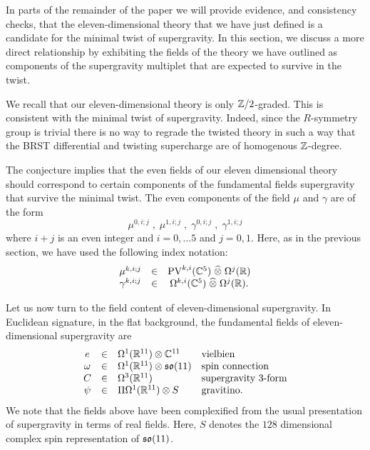 \documentclass[11pt]{amsart}
\def\pv{{\rm PV}}
\begin{document}

In parts of the remainder of the paper we will provide evidence, and consistency checks, that the eleven-dimensional theory that we have just defined is a candidate for the minimal twist of supergravity.
In this section, we discuss a more direct relationship by exhibiting the fields of the theory we have outlined as components of the supergravity multiplet that are expected to survive in the twist.

We recall that our eleven-dimensional theory is only $\mathbb Z/2$-graded.
This is consistent with the minimal twist of supergravity.
Indeed, since the $R$-symmetry group is trivial there is no way to regrade the twisted theory in such a way that the BRST differential and twisting supercharge are of homogenous $\mathbb Z$-degree.

The conjecture implies that the even fields of our eleven dimensional theory should correspond to certain components of the fundamental fields supergravity that survive the minimal twist.
The even components of the field $\mu$ and $\gamma$ are of the form
\[
  \mu^{0, i ; j} \; , \; \mu^{1, i ; j} \; , \; \gamma^{0, i ; j} \; , \; \gamma^{1, i ; j}
\]
where $i+j$ is an even integer and $i = 0,\ldots 5$ and $j=0,1$.
Here, as in the previous section, we have used the following index notation:
\[
  \begin{array}{ccccc}
    \mu^{k, i ; j} & \in & \pv^{k,i} (\CC^5) \; \Hat{\otimes} \; \Omega^j(\RR) \\
    \gamma^{k, i ; j} & \in & \Omega^{k,i}(\CC^5) \; \Hat{\otimes} \; \Omega^j(\RR).
  \end{array}
\]

Let us now turn to the field content of eleven-dimensional supergravity.
In Euclidean signature, in the flat background, the fundamental fields of eleven-dimensional supergravity are
\[
  \begin{array}{ccll}
    e & \in & \Omega^1(\mathbb R^{11}) \otimes \mathbb C^{11} & \mbox{vielbien} \\
    \omega & \in & \Omega^1(\mathbb R^{11}) \otimes \mathfrak s \mathfrak o(11) & \mbox{spin connection} \\
    C & \in & \Omega^3(\mathbb R^{11}) & \mbox{supergravity $3$-form} \\
    \psi & \in & \Pi \Omega^1(\mathbb R^{11}) \otimes S & \mbox{gravitino} .
  \end{array}
\]
We note that the fields above have been complexified from the usual presentation of supergravity in terms of real fields.
Here, $S$ denotes the $128$ dimensional complex spin representation of $\mathfrak s \mathfrak o(11)$.
\end{document}
